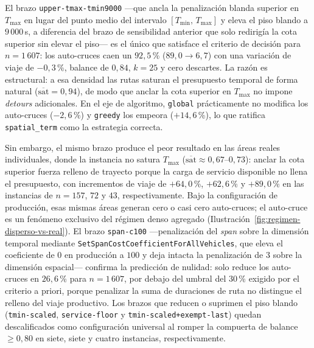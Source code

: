 El brazo \texttt{upper-tmax-tmin9000} ---que ancla la penalización blanda superior en
$T_{\max}$ en lugar del punto medio del intervalo $[T_{\min},\,T_{\max}]$ y eleva el
piso blando a $9\,000$\,s, a diferencia del brazo de sensibilidad anterior que solo
redirigía la cota superior sin elevar el piso--- es el único que satisface el criterio de decisión para
$n=1\,607$: los auto-cruces caen un $92{,}5$\,\% ($89{,}0 \to 6{,}7$) con una variación de
viaje de $-0{,}3$\,\%, balance de $0{,}84$, $k=25$ y cero descartes. La razón es
estructural: a esa densidad las rutas saturan el presupuesto temporal de forma natural
($\overline{\text{sat}} = 0{,}94$), de modo que anclar la cota superior en $T_{\max}$ no
impone \textit{detours} adicionales. En el eje de algoritmo, \texttt{global} prácticamente no
modifica los auto-cruces ($-2{,}6$\,\%) y \texttt{greedy} los empeora ($+14{,}6$\,\%), lo que
ratifica \texttt{spatial\_term} como la estrategia correcta.

Sin embargo, el mismo brazo produce el peor resultado en las áreas reales individuales,
donde la instancia no satura $T_{\max}$ ($\overline{\text{sat}} \approx 0{,}67$--$0{,}73$):
anclar la cota superior fuerza relleno de trayecto porque la carga de servicio disponible
no llena el presupuesto, con incrementos de viaje de $+64{,}0$\,\%, $+62{,}6$\,\% y
$+89{,}0$\,\% en las instancias de $n = 157$, $72$ y $43$, respectivamente. Bajo la
configuración de producción, esas mismas áreas generan cero o casi cero auto-cruces; el
auto-cruce es un fenómeno exclusivo del régimen denso agregado
(Ilustración~\ref{fig:regimen-disperso-vs-real}). El brazo \texttt{span-c100} ---penalización
del \textit{span} sobre la dimensión temporal mediante
\texttt{SetSpanCostCoefficientForAllVehicles}, que eleva el coeficiente de $0$ en
producción a $100$ y deja intacta la penalización de $3$ sobre la dimensión espacial---
confirma la predicción de nulidad: solo reduce los auto-cruces en $26{,}6$\,\% para
$n=1\,607$, por debajo del umbral del $30$\,\% exigido por el criterio a priori, porque
penalizar la suma de duraciones de ruta no distingue el relleno del viaje productivo.
Los brazos que reducen o suprimen el piso blando
(\texttt{tmin-scaled}, \texttt{service-floor} y \texttt{tmin-scaled+exempt-last}) quedan
descalificados como configuración universal al romper la compuerta de balance $\geq 0{,}80$
en siete, siete y cuatro instancias, respectivamente.

